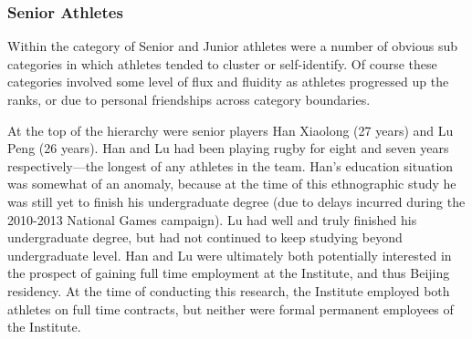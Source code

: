\begin{CJK}{UTF8}{gbsn}
\subsubsection{Senior Athletes}

Within the category of Senior and Junior athletes were a number of obvious sub categories in which athletes tended to cluster or self-identify.  Of course these categories involved some level of flux and fluidity as athletes progressed up the ranks, or due to personal friendships across category boundaries.

At the top of the hierarchy were senior players Han Xiaolong (27 years) and Lu Peng (26 years). Han and Lu had been playing rugby for eight and seven years respectively---the longest of any athletes in the team.  Han's education situation was somewhat of an anomaly, because at the time of this ethnographic study he was still yet to finish his undergraduate degree (due to delays incurred during the 2010-2013 National Games campaign). Lu had well and truly finished his undergraduate degree, but had not continued to keep studying beyond undergraduate level. Han and Lu were ultimately both potentially interested in the prospect of gaining full time employment at the Institute, and thus Beijing residency.  At the time of conducting this research, the Institute employed both athletes on full time contracts, but neither were formal permanent employees of the Institute.


\end{CJK}
